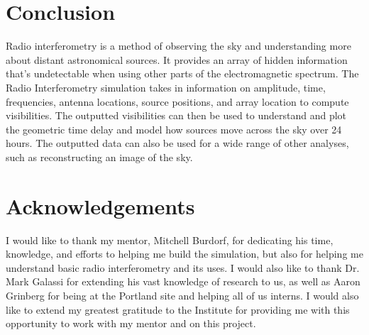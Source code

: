\documentclass[12pt]{article}
\begin{document}
\section{Conclusion}
Radio interferometry is a method of observing the sky and understanding more about distant astronomical sources. It provides an array of hidden information that's undetectable when using other parts of the electromagnetic spectrum. The Radio Interferometry simulation takes in information on amplitude, time, frequencies, antenna locations, source positions, and array location to compute visibilities. The outputted visibilities can then be used to understand and plot the geometric time delay and model how sources move across the sky over 24 hours. The outputted data can also be used for a wide range of other analyses, such as reconstructing an image of the sky. 


\section*{Acknowledgements}
I would like to thank my mentor, Mitchell Burdorf, for dedicating his time, knowledge, and efforts to helping me build the simulation, but also for helping me understand basic radio interferometry and its uses. I would also like to thank Dr. Mark Galassi for extending his vast knowledge of research to us, as well as Aaron Grinberg for being at the Portland site and helping all of us interns. I would also like to extend my greatest gratitude to the Institute for providing me with this opportunity to work with my mentor and on this project.




\end{document}
